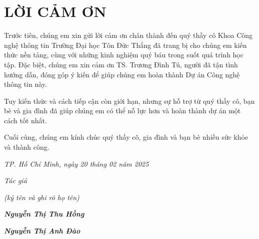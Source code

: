 \documentclass[13pt]{article}
\renewcommand{\headrulewidth}{0pt} %
\begin{document}
\renewcommand\thesection{\arabic{section}}


\pagestyle{fancy}
\fancyhf{}
\fancyhead[C]{\thepage}
\renewcommand{\headrulewidth}{0pt} %

\chead{}
\cfoot{}
\rfoot{\thepage}

\newpage
\section*{LỜI CẢM ƠN}
    Trước tiên, chúng em xin gửi lời cảm ơn chân thành đến quý thầy cô Khoa Công nghệ thông tin Trường Đại học Tôn Đức Thắng đã trang bị cho chúng em kiến thức nền tảng, cùng với những kinh nghiệm quý báu trong suốt quá trình học tập. Đặc biệt, chúng em xin cảm ơn TS. Trương Đình Tú, người đã tận tình hướng dẫn, đóng góp ý kiến để giúp chúng em hoàn thành Dự án Công nghệ thông tin này. 
    
    Tuy kiến thức và cách tiếp cận còn giới hạn, nhưng sự hỗ trợ từ quý thầy cô, bạn bè và gia đình đã giúp chúng em có thể nỗ lực hơn và hoàn thành dự án một cách tốt nhất. 
    
    Cuối cùng, chúng em kính chúc quý thầy cô, gia đình và bạn bè nhiều sức khỏe và thành công.

\begin{flushright}
    \textit{TP. Hồ Chí Minh, ngày 20 tháng 02 năm 2025}\\      
    \begin{adjustwidth}{10cm}{}
    \textit{Tác giả}\\
    \end{adjustwidth} 
    
    \begin{adjustwidth}{8cm}{}
	\textit{(ký tên và ghi rõ họ tên)}\\
    \end{adjustwidth} 
    
    \begin{adjustwidth}{8.5cm}{}
    \textbf{\textit{Nguyễn Thị Thu Hồng}}\\
    \end{adjustwidth} 
    
    \begin{adjustwidth}{8.5cm}{}
    \textbf{\textit{Nguyễn Thị Anh Đào}}
    \end{adjustwidth} 
\end{flushright}
\end{document}
